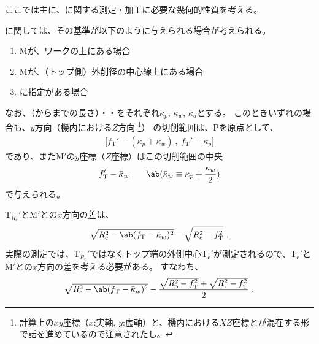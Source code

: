 

ここでは主に、\textbf{\Keyway}に関する測定・加工に必要な幾何的性質を考える。



\textbf{\Keyway}に関しては、その基準が以下のように与えられる場合が考えられる。
\begin{enumerate}[label=\sarrow]
\item \KeywayCenter Mが、ワークの\CenterCurvatureLine 上にある場合
\item \KeywayCenter Mが、（トップ側）外削径の中心線上にある場合
\item \AsideKeywayDepth に指定がある場合
\end{enumerate}
なお、\textgt{\KeywayPos}（\EndFace から\Keyway までの長さ）・\textgt{\KeywayWidth}・\textgt{\AsideKeywayDepth}をそれぞれ$\kappa_p$, $\kappa_w$, $\kappa_d$とする。
このときいずれの場合も、$y$方向（機内における$Z$方向
\footnote{計算上の$xy$座標（$x$:実軸, $y$:虚軸）と、機内における$XZ$座標とが混在する形で話を進めているので注意されたし。}）
の切削範囲は、\TableCenter Pを原点として、
\begin{align*}
  \big[f_\mathrm T'-(\kappa_p+\kappa_w)\ ,\ f_\mathrm T'-\kappa_p\big]
\end{align*}
であり、また\KeywayCenter M$'$の$y$座標（$Z$座標）はこの切削範囲の中央
\begin{align}
  \label{eq:mizocenterZ}
  f_\mathrm T'-\bar\kappa_w \qquad
  \ab(\bar\kappa_w \equiv \kappa_p+\frac{\kappa_w}2)
\end{align}
で与えられる。



\clearpage
\TopCurvatureCenter T$_{R_\mathrm c}'$と\KeywayCenter M$'$との$x$方向の差は、
\begin{align*}
  \sqrt{R_\mathrm c^2-\ab(f_\mathrm T-\bar\kappa_w)^2}
  -\sqrt{R_\mathrm c^2-f_\mathrm T^2}\ .
\end{align*}
実際の測定では、\TopCurvatureCenter T$_{R_\mathrm c}'$ではなくトップ端の外側中心T$_\mathrm c'$が測定されるので、T$_\mathrm c'$とM$'$との$x$方向の差を考える必要がある。
すなわち、
\begin{align}
  \label{eq:difTopKeywayCenter}
  \sqrt{R_\mathrm c^2-\ab(f_\mathrm T-\bar\kappa_w)^2}
  -\frac{\sqrt{R_\mathrm o^2-f_\mathrm T^2}+\sqrt{R_\mathrm i^2-f_\mathrm T^2}}2\ .
\end{align}


